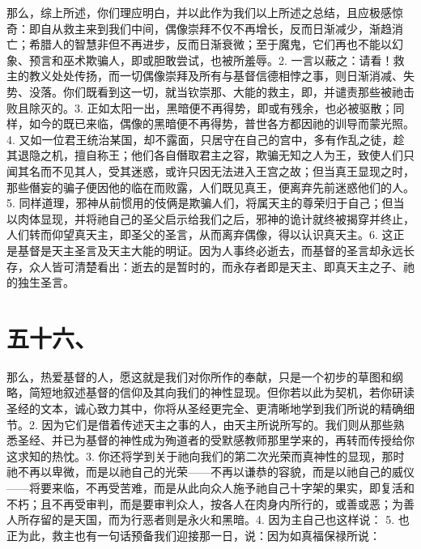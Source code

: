 那么，综上所述，你们理应明白，并以此作为我们以上所述之总结，且应极感惊奇：即自从救主来到我们中间，偶像崇拜不仅不再增长，反而日渐减少，渐趋消亡；希腊人的智慧非但不再进步，反而日渐衰微；至于魔鬼，它们再也不能以幻象、预言和巫术欺骗人，即或胆敢尝试，也被所羞辱。2. 一言以蔽之：请看！救主的教义处处传扬，而一切偶像崇拜及所有与基督信德相悖之事，则日渐消减、失势、没落。你们既看到这一切，就当钦崇那、大能的救主，即，并谴责那些被祂击败且除灭的。3. 正如太阳一出，黑暗便不再得势，即或有残余，也必被驱散；同样，如今的既已来临，偶像的黑暗便不再得势，普世各方都因祂的训导而蒙光照。4. 又如一位君王统治某国，却不露面，只居守在自己的宫中，多有作乱之徒，趁其退隐之机，擅自称王；他们各自僭取君主之容，欺骗无知之人为王，致使人们只闻其名而不见其人，受其迷惑，或许只因无法进入王宫之故；但当真王显现之时，那些僭妄的骗子便因他的临在而败露，人们既见真王，便离弃先前迷惑他们的人。5. 同样道理，邪神从前惯用的伎俩是欺骗人们，将属天主的尊荣归于自己；但当以肉体显现，并将祂自己的圣父启示给我们之后，邪神的诡计就终被揭穿并终止，人们转而仰望真天主，即圣父的圣言，从而离弃偶像，得以认识真天主。6. 这正是基督是天主圣言及天主大能的明证。因为人事终必逝去，而基督的圣言却永远长存，众人皆可清楚看出：逝去的是暂时的，而永存者即是天主、即真天主之子、祂的独生圣言。\par


\section{五十六、}

那么，热爱基督的人，愿这就是我们对你所作的奉献，只是一个初步的草图和纲略，简短地叙述基督的信仰及其向我们的神性显现。但你若以此为契机，若你研读圣经的文本，诚心致力其中，你将从圣经更完全、更清晰地学到我们所说的精确细节。2. 因为它们是借着传述天主之事的人，由天主所说所写的。我们则从那些熟悉圣经、并已为基督的神性成为殉道者的受默感教师那里学来的，再转而传授给你这求知的热忱。3. 你还将学到关于祂向我们的第二次光荣而真神性的显现，那时祂不再以卑微，而是以祂自己的光荣——不再以谦恭的容貌，而是以祂自己的威仪——将要来临，不再受苦难，而是从此向众人施予祂自己十字架的果实，即复活和不朽；且不再受审判，而是要审判众人，按各人在肉身内所行的，或善或恶；为善人所存留的是天国，而为行恶者则是永火和黑暗。4. 因为主自己也这样说： 5. 也正为此，救主也有一句话预备我们迎接那一日，说：因为如真福保禄所说：\par

